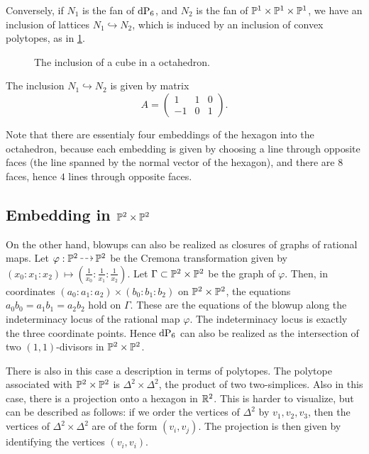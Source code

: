 Conversely, if $N_1$ is the fan of $\dP6$, and $N_2$ is the fan of $\P^1 \times \P^1 \times \P^1$, we have an inclusion of lattices $N_1 \hookrightarrow N_2$, which is induced by an inclusion of convex polytopes, as in \cref{fig:octahedron_hexagon}.

 \begin{figure}
\centering 

\caption{The inclusion of a cube in a octahedron.}
\label{fig:octahedron_hexagon}
\end{figure}

The inclusion $N_1 \hookrightarrow N_2$ is given by matrix
\begin{equation}
\label{eq:A}
A = 
\begin{pmatrix}
1 & 1 & 0 \\
-1 & 0 & 1
\end{pmatrix}.
\end{equation}

Note that there are essentialy four embeddings of the hexagon into the octahedron, because each embedding is given by choosing a line through opposite faces (the line spanned by the normal vector of the hexagon), and there are $8$ faces, hence $4$ lines through opposite faces.

\subsection{Embedding in $\P^2 \times \P^2$}

On the other hand, blowups can also be realized as closures of graphs of rational maps. Let $\varphi: \P^2 \rmap \P^2$ be the Cremona transformation given by $(x_0:x_1:x_2) \mapsto \left( \frac 1{x_0}: \frac 1{x_1}:\frac 1{x_2} \right)$. Let $\Gamma \subset \P^2 \times \P^2$ be the graph of $\varphi$. Then, in coordinates $(a_0:a_1:a_2) \times(b_0:b_1:b_2)$ on $\P^2 \times \P^2$, the equations $a_0b_0=a_1b_1=a_2b_2$ hold \label{eq:dp6_inp2p2} on $\Gamma$. These are the equations of the blowup along the indeterminacy locus of the rational map $\varphi$. The indeterminacy locus is exactly the three coordinate points. Hence $\dP6$ can also be realized as the intersection of two $(1,1)$-divisors in $\P^2 \times \P^2$. 

There is also in this case a description in terms of polytopes. The polytope associated with $\P^2 \times \P^2$ is $\Delta^2 \times \Delta^2$, the product of two two-simplices. Also in this case, there is a projection onto a hexagon in $\R^2$. This is harder to visualize, but can be described as follows: if we order the vertices of $\Delta^2$ by $v_1,v_2,v_3$, then the vertices of $\Delta^2 \times \Delta^2$ are of the form $(v_i,v_j)$. The projection is then given by identifying the vertices $(v_i,v_i)$. 

